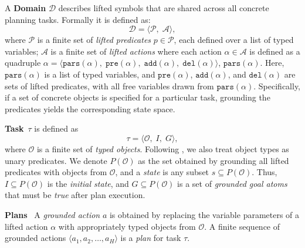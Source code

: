 \documentclass[letterpaper, 10pt, journal, twoside]{IEEEtran}
\newcommand{\myparagraph}[1]{\noindent\textbf{#1}~}
\begin{document}
\noindent A \textbf{Domain} $\mathcal D$ describes lifted symbols that are shared across all concrete planning tasks. Formally it is defined as:
\begin{equation}
  \mathcal D=\langle \mathcal P,\;\mathcal A \rangle ,
\end{equation}
where $\mathcal P$ is a finite set of \emph{lifted predicates} $p\in \mathcal P$, each defined over a list of typed variables; $\mathcal A$ is a finite set of \emph{lifted actions} where each action $\alpha\in \mathcal A$ is defined as a quadruple $\alpha = \langle \mathtt{pars}(\alpha),\; \mathtt{pre}(\alpha),\; \mathtt{add}(\alpha),\; \mathtt{del}(\alpha) \rangle $, $\mathtt{pars}(\alpha)$.
Here, $\mathtt{pars}(\alpha)$ is a list of typed variables, and $\mathtt{pre}(\alpha)$, $\mathtt{add}(\alpha)$, and $\mathtt{del}(\alpha)$ are sets of lifted predicates, with all free variables drawn from $\mathtt{pars}(\alpha)$. Specifically, if a set of concrete objects is specified for a particular task, grounding the predicates yields the corresponding state space.


\myparagraph{Task}$\tau$ is defined as
\begin{equation}
  \tau=\langle \mathcal O,\;I,\;G \rangle,
\end{equation}
where $\mathcal O$ is a finite set of \emph{typed objects}. Following \cite{silver2021planning}, we also treat object types as unary predicates.
We denote $P(\mathcal O)$ as the set obtained by grounding all lifted predicates with objects from $\mathcal O$, and a \textit{state} is any subset $s\!\subseteq\mathcal  \!P(\mathcal O)$. Thus, $I\!\subseteq\mathcal \!P(\mathcal O)$ is the \textit{initial state}, and
$G\!\subseteq\mathcal \!P(\mathcal O)$ is a set of \textit{grounded goal atoms} that must be \textit{true} after plan execution. 

\myparagraph{Plans}
A \emph{grounded action} $a$ is obtained by replacing the variable parameters of a lifted action $\alpha$ with appropriately typed objects from $\mathcal O$. 
A finite sequence of grounded actions
$
  \langle a_1,a_2,\ldots,a_{H}\rangle
$
is a \textit{plan} for task $\tau$.
\end{document}
